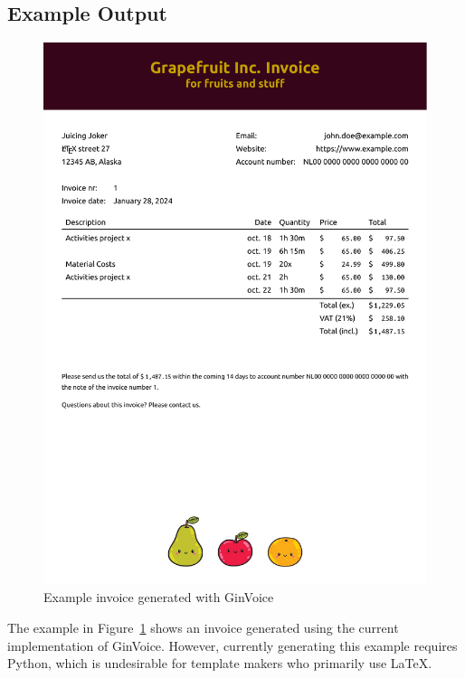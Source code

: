 \subsection{Example Output}
\begin{figure}[!ht]
    \centering
    \includegraphics[width=\linewidth]{ginvoice/ginvoice.pdf}
    \caption{Example invoice generated with GinVoice}
    \label{fig:voorbeeldfactuur}
\end{figure}

The example in Figure~\ref{fig:voorbeeldfactuur} shows an invoice generated using the current implementation of GinVoice.
However, currently generating this example requires Python, which is undesirable for template makers who primarily use \LaTeX.
